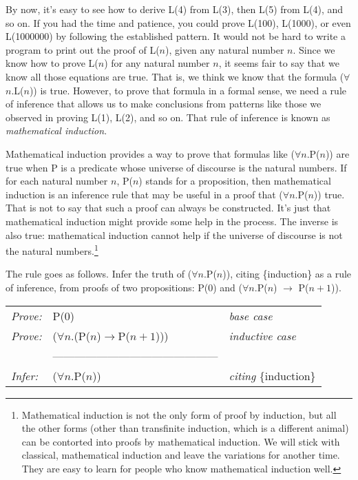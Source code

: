 \label{induction-rationale}
By now, it's easy to see how to derive L(4) from L(3),
then L(5) from L(4), and so on.
If you had the time and patience, you could prove L(100), L(1000), or even L(1000000)
by following the established pattern.
It would not be hard to write a program to print out the proof of L($n$),
given any natural number $n$.
Since we know how to prove L($n$) for any natural number $n$,
it seems fair to say that we know all those equations are true.
That is, we think we know that the formula ($\forall$$n$.L($n$)) is true.
However, to prove that formula in a formal sense,
we need a rule of inference that allows us to make conclusions
from patterns like those we observed in proving L(1), L(2), and so on.
That rule of inference is known as \emph{mathematical induction}.

Mathematical induction provides a way to prove that
formulas like ($\forall$$n$.P($n$)) are true
when P is a predicate whose universe of discourse is the natural numbers.
If for each natural number $n$, P($n$) stands for a proposition,
then mathematical induction is an inference rule that may be useful
in a proof that ($\forall$$n$.P($n$)) true.
That is not to say that such a proof can always be constructed.
It's just that mathematical induction might provide some help in the process.
The inverse is also true: mathematical induction cannot help
if the universe of discourse is not the natural numbers.\footnote{Mathematical
induction is not the only form
of proof by induction, but all the other forms
(other than transfinite induction, which is a different animal)
can be contorted into proofs by mathematical induction.
We will stick with classical, mathematical induction
and leave the variations for another time.
They are easy to learn for people who know mathematical induction well.}

The rule goes as follows. Infer the truth of ($\forall$$n$.P($n$)),
citing \{induction\} as a rule of inference,
from proofs of two propositions:
P(0) and ($\forall n.$P($n$) $\rightarrow$ P($n+1$)).

\begin{center}
\begin{tabular}{lll}
\emph{Prove:} & P($0$)                                      &     \emph{base case}\\
\emph{Prove:} & ($\forall$$n$.(P($n$)$\rightarrow$P($n+1$)))&\emph{inductive case}\\
              &---------------------------------------------& \\
\emph{Infer:} & ($\forall$$n$.P($n$))                    & \emph{citing} \{induction\}\\
\end{tabular}
\end{center}

